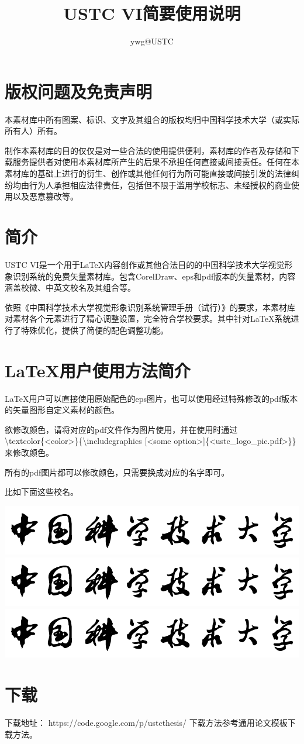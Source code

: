 \documentclass{article}
\title{USTC VI简要使用说明}
\author{ywg@USTC}
\date{}
\begin{document}
\maketitle
\section{版权问题及免责声明}
本素材库中所有图案、标识、文字及其组合的版权均归中国科学技术大学（或实际所有人）所有。

制作本素材库的目的仅仅是对一些合法的使用提供便利，素材库的作者及存储和下载服务提供者对使用本素材库所产生的后果不承担任何直接或间接责任。任何在本素材库的基础上进行的衍生、创作或其他任何行为所可能直接或间接引发的法律纠纷均由行为人承担相应法律责任，包括但不限于滥用学校标志、未经授权的商业使用以及恶意篡改等。

\section{简介}
USTC VI是一个用于\LaTeX{}内容创作或其他合法目的的中国科学技术大学视觉形象识别系统的免费矢量素材库。包含CorelDraw、eps和pdf版本的矢量素材，内容涵盖校徽、中英文校名及其组合等。

依照《中国科学技术大学视觉形象识别系统管理手册（试行）》的要求，本素材库对素材各个元素进行了精心调整设置，完全符合学校要求。其中针对\LaTeX{}系统进行了特殊优化，提供了简便的配色调整功能。

\section{\LaTeX{}用户使用方法简介}
\LaTeX{}用户可以直接使用原始配色的eps图片，也可以使用经过特殊修改的pdf版本的矢量图形自定义素材的颜色。

欲修改颜色，请将对应的pdf文件作为图片使用，并在使用时通过\textbackslash{}textcolor\{<color>\}\{\textbackslash{}includegraphics [<some option>]\{<ustc\_logo\_pic.pdf>\}\}来修改颜色。

所有的pdf图片都可以修改颜色，只需要换成对应的名字即可。

比如下面这些校名。

\noindent
\textcolor{ustcblue}{\includegraphics[width=\textwidth]{./pdffigures/ustc_logo_text.pdf}}
\textcolor{red}{\includegraphics[width=\textwidth]{./pdffigures/ustc_logo_text.pdf}}
\textcolor{black}{\includegraphics[width=\textwidth]{./pdffigures/ustc_logo_text.pdf}}

\section{下载}
下载地址： https://code.google.com/p/ustcthesis/
下载方法参考通用论文模板下载方法。
\end{document}
